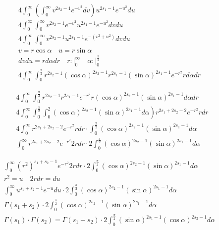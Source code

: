 	$$
	\begin{gathered}
		4 \int_0^{\infty}\left(\int_0^{\infty} v^{2 s_2-1} e^{-v^2} d v\right) u^{2 s_1-1} e^{-u^2} d u \\
		4 \int_0^{\infty} \int_0^{\infty} v^{2 s_2-1} e^{-v^2} u^{2 s_1-1} e^{-u^2} d v d u \\
		4 \int_0^{\infty} \int_0^{\infty} v^{2 s_2-1} u^{2 s_1-1} e^{-\left(v^2+u^2\right)} d v d u \\
		v=r \cos \alpha \quad u=r \sin \alpha \\
		d v d u=r d \alpha d r \quad r:\left.\right|_0 ^{\infty} \quad \alpha:\left.\right|_0 ^{\frac{\pi}{2}} \\
		4 \int_0^{\infty} \int_0^{\frac{\pi}{2}} r^{2 s_2-1}(\cos \alpha)^{2 s_2-1} r^{2 s_1-1}(\sin \alpha)^{2 s_1-1} e^{-r^2} r d \alpha d r
	\end{gathered}
	$$
	
	$$
	\begin{aligned}
		& 4 \int_0^{\infty} \int_0^{\frac{\pi}{2}} r^{2 s_2-1} r^{2 s_1-1} e^{-r^2} r(\cos \alpha)^{2 s_2-1}(\sin \alpha)^{2 s_1-1} d \alpha d r \\
		& \left.4 \int_0^{\infty} \int_0^{\frac{\pi}{2}} \int_0^2(\cos \alpha)^{2 s_2-1}(\sin \alpha)^{2 s_1-1} d \alpha\right) r^{2 s_1+2 s_2-2} e^{-r^2} r d r \\
		& 4 \int_0^{\infty} r^{2 s_1+2 s_2-2} e^{-r^2} r d r \cdot \int_0^{\frac{\pi}{2}}(\cos \alpha)^{2 s_2-1}(\sin \alpha)^{2 s_1-1} d \alpha \\
		& \int_0^{\infty} r^{2 s_1+2 s_2-2} e^{-r^2} 2 r d r \cdot 2 \int_0^{\frac{\pi}{2}}(\cos \alpha)^{2 s_2-1}(\sin \alpha)^{2 s_1-1} d \alpha
	\end{aligned}
	$$
	
	$$
	\begin{gathered}
		\int_0^{\infty}\left(r^2\right)^{s_1+s_2-1} e^{-r^2} 2 r d r \cdot 2 \int_0^{\frac{\pi}{2}}(\cos \alpha)^{2 s_2-1}(\sin \alpha)^{2 s_1-1} d \alpha \\
		r^2=u \quad 2 r d r=d u \\
		\int_0^{\infty} u^{s_1+s_2-1} e^{-u} d u \cdot 2 \int_0^{\frac{\pi}{2}}(\cos \alpha)^{2 s_2-1}(\sin \alpha)^{2 s_1-1} d \alpha \\
		\Gamma\left(s_1+s_2\right) \cdot 2 \int_0^{\frac{\pi}{2}}(\cos \alpha)^{2 s_2-1}(\sin \alpha)^{2 s_1-1} d \alpha \\
		\Gamma\left(s_1\right) \cdot \Gamma\left(s_2\right)=\Gamma\left(s_1+s_2\right) \cdot 2 \int_0^{\frac{\pi}{2}}(\sin \alpha)^{2 s_1-1}(\cos \alpha)^{2 s_2-1} d \alpha
	\end{gathered}
	$$
	
